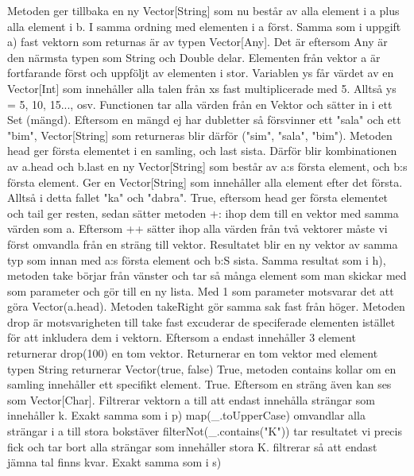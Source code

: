 \begin{REPLnonum}
\Task %

\Subtask
Metoden ger tillbaka en ny Vector[String] som nu består av alla element i a plus alla element i b. I samma ordning med elementen i a först.
\Subtask
Samma som i uppgift a) fast vektorn som returnas är av typen Vector[Any]. Det är eftersom Any är den närmsta typen som String och Double delar. Elementen från vektor a är fortfarande först och uppföljt av elementen i stor.
\Subtask
Variablen ys får värdet av en Vector[Int] som innehåller alla talen från xs fast multiplicerade med 5. Alltså ys = 5, 10, 15..., osv.
\Subtask
Functionen tar alla värden från en Vektor och sätter in i ett Set (mängd). Eftersom en mängd ej har dubletter så försvinner ett "sala" och ett "bim", Vector[String] som returneras blir därför ("sim", "sala", "bim").
\Subtask
Metoden head ger första elementet i en samling, och last sista. Därför blir kombinationen av a.head och b.last en ny Vector[String] som består av a:s första element, och b:s första element.
\Subtask
Ger en Vector[String] som innehåller alla element efter det första. Alltså i detta fallet "ka" och "dabra".
\Subtask
True, eftersom head ger första elementet och tail ger resten, sedan sätter metoden +: ihop dem till en vektor med samma värden som a.
\Subtask
Eftersom ++ sätter ihop alla värden från två vektorer måste vi först omvandla från en sträng till vektor. Resultatet blir en ny vektor av samma typ som innan med a:s första element och b:S sista.
\Subtask
Samma resultat som i h), metoden take börjar från vänster och tar så många element som man skickar med som parameter och gör till en ny lista. Med 1 som parameter motsvarar det att göra Vector(a.head). Metoden takeRight gör samma sak fast från höger.
\Subtask
Metoden drop är motsvarigheten till take fast excuderar de speciferade elementen istället för att inkludera dem i vektorn.
\Subtask
Eftersom a endast innehåller 3 element returnerar drop(100) en tom vektor.
\Subtask
Returnerar en tom vektor med element typen String
\Subtask
returnerar Vector(true, false) 
\Subtask
True, metoden contains kollar om en samling innehåller ett specifikt element.
\Subtask
True. Eftersom en sträng även kan ses som Vector[Char].
\Subtask
Filtrerar vektorn a till att endast innehålla strängar som innehåller k.
\Subtask
Exakt samma som i p)
\Subtask
map(_.toUpperCase) omvandlar alla strängar i a till stora bokstäver
filterNot(_.contains("K")) tar resultatet vi precis fick och tar bort alla strängar som innehåller stora K.
\Subtask
filtrerar så att endast jämna tal finns kvar.
\Subtask
Exakt samma som i s)


\end{REPLnonum}
